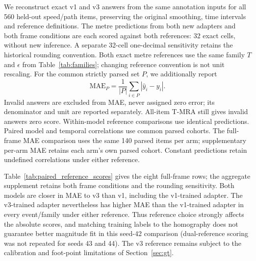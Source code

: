 \documentclass[11pt]{article}
\begin{document}
We reconstruct exact v1 and v3 answers from the same annotation inputs for
all 560 held-out speed/path items, preserving the original smoothing,
time intervals and reference definitions. The metre predictions from both
new adapters and both frame conditions are each scored against both
references: 32 exact cells, without new inference. A separate 32-cell
one-decimal sensitivity retains the historical rounding convention.
Both exact metre references use the same family $T$ and $\epsilon$ from
Table~\ref{tab:families}; changing reference convention is not unit
rescaling. For the common strictly parsed set $P$, we additionally report
\begin{equation}
\label{eq:paired_reference_mae}
\mathrm{MAE}_{P}=\frac{1}{|P|}\sum_{i\in P}|\hat y_i-y_i|.
\end{equation}
Invalid answers are excluded from MAE, never assigned zero error; its
denominator and unit are reported separately. All-item T-MRA still gives
invalid answers zero score. Within-model reference comparisons use identical
predictions. Paired model and temporal correlations use common parsed
cohorts. The full-frame MAE comparison uses the same 140 parsed items per
arm; supplementary per-arm MAE retains each arm's own parsed cohort.
Constant predictions retain undefined correlations under either reference.

Table~\ref{tab:paired_reference_scores} gives the eight full-frame rows;
the aggregate supplement retains both frame conditions and the rounding
sensitivity. Both models are closer in MAE to v3 than v1, including the
v1-trained adapter. The v3-trained adapter nevertheless has higher MAE
than the v1-trained adapter in every event/family under either reference.
Thus reference choice strongly affects the absolute scores, and matching
training labels to the homography does not guarantee better magnitude fit
in this seed-42 comparison (dual-reference scoring was not repeated for seeds 43
and 44). The v3 reference remains subject to the
calibration and foot-point limitations of Section~\ref{sec:gt}.
\end{document}
